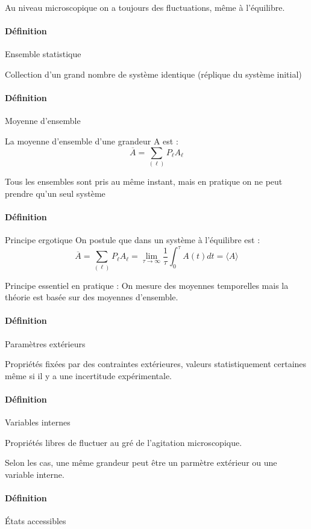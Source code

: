 \documentclass[12pt,a4paper]{report}
\begin{document}
Au niveau microscopique on a toujours des fluctuations, même à l'équilibre.

\paragraph{Définition} Ensemble statistique

Collection d'un grand nombre de système identique (réplique du système initial)

\paragraph{Définition} Moyenne d'ensemble

La moyenne d'ensemble d'une grandeur A est :
\[
	\overline{A} = \sum_{(\ell)} P_\ell A_\ell
\]

Tous les ensembles sont pris au même instant, mais en pratique on ne peut prendre qu'un seul système

\paragraph{Définition} Principe ergotique
On postule que dans un système à l'équilibre est :
\[
	\overline{A} = \sum_{(\ell)} P_\ell A_\ell = \underset{\tau \rightarrow \infty}{\lim} \dfrac{1}{\tau} \int_0^\tau A(t) dt = \langle A \rangle
\]

Principe essentiel en pratique : On mesure des moyennes temporelles mais la théorie est basée sur des moyennes d'ensemble.

\paragraph{Définition} Paramètres extérieurs

Propriétés fixées par des contraintes extérieures, valeurs statistiquement certaines même si il y a une incertitude expérimentale.

\paragraph{Définition} Variables internes

Propriétés libres de fluctuer au gré de l'agitation microscopique.

Selon les cas, une même grandeur peut être un parmètre extérieur ou une variable interne.

\paragraph{Définition} États accessibles
\end{document}
